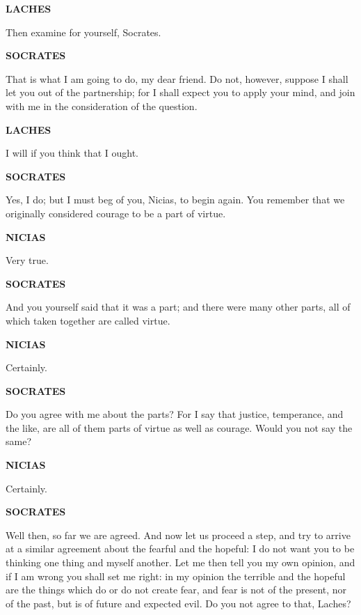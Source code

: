 \documentclass[11pt,letter]{book}
\begin{document}
\par \textbf{LACHES}
\par   Then examine for yourself, Socrates.

\par \textbf{SOCRATES}
\par   That is what I am going to do, my dear friend. Do not, however, suppose I shall let you out of the partnership; for I shall expect you to apply your mind, and join with me in the consideration of the question.

\par \textbf{LACHES}
\par   I will if you think that I ought.

\par \textbf{SOCRATES}
\par   Yes, I do; but I must beg of you, Nicias, to begin again. You remember that we originally considered courage to be a part of virtue.

\par \textbf{NICIAS}
\par   Very true.

\par \textbf{SOCRATES}
\par   And you yourself said that it was a part; and there were many other parts, all of which taken together are called virtue.

\par \textbf{NICIAS}
\par   Certainly.

\par \textbf{SOCRATES}
\par   Do you agree with me about the parts? For I say that justice, temperance, and the like, are all of them parts of virtue as well as courage. Would you not say the same?

\par \textbf{NICIAS}
\par   Certainly.

\par \textbf{SOCRATES}
\par   Well then, so far we are agreed. And now let us proceed a step, and try to arrive at a similar agreement about the fearful and the hopeful:  I do not want you to be thinking one thing and myself another. Let me then tell you my own opinion, and if I am wrong you shall set me right:  in my opinion the terrible and the hopeful are the things which do or do not create fear, and fear is not of the present, nor of the past, but is of future and expected evil. Do you not agree to that, Laches?
\end{document}
